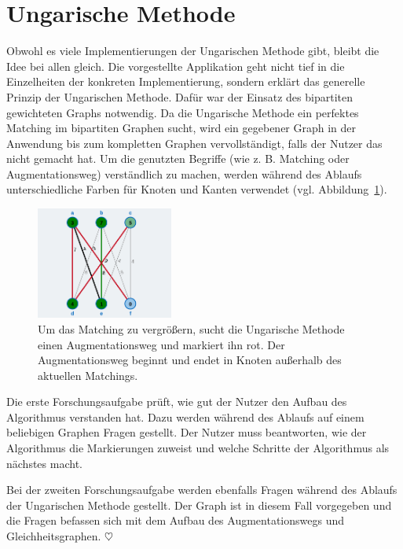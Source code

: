 \section{Ungarische Methode} %

Obwohl es viele Implementierungen der Ungarischen Methode gibt, bleibt die Idee bei allen gleich. Die vorgestellte Applikation geht nicht tief in die Einzelheiten der konkreten Implementierung, sondern erklärt das generelle Prinzip der Ungarischen Methode. Dafür war der Einsatz des bipartiten gewichteten Graphs notwendig. Da die Ungarische Methode ein perfektes Matching im bipartiten Graphen sucht, wird ein gegebener Graph in der Anwendung bis zum kompletten Graphen vervollständigt, falls der Nutzer das nicht gemacht hat. Um die genutzten Begriffe (wie z. B. Matching oder Augmentationsweg) verständlich zu machen, werden während des Ablaufs unterschiedliche Farben für Knoten und Kanten verwendet (vgl. Abbildung~\ref{fig:hungarian-colors}).

\begin{figure}[h!]
	\centering
	\includegraphics[width=0.4\textwidth]{figures/hungarian-colors}
	\caption[Ungarische Methode: Augmentationsweg]{Um das Matching zu vergrößern, sucht die Ungarische Methode einen Augmentationsweg und markiert ihn rot. Der Augmentationsweg beginnt und endet in Knoten außerhalb des aktuellen Matchings. }\label{fig:hungarian-colors}
\end{figure}

Die erste Forschungsaufgabe prüft, wie gut der Nutzer den Aufbau des Algorithmus verstanden hat. Dazu werden während des Ablaufs auf einem beliebigen Graphen Fragen gestellt. Der Nutzer muss beantworten, wie der Algorithmus die Markierungen zuweist und welche Schritte der Algorithmus als nächstes macht. 

Bei der zweiten Forschungsaufgabe werden ebenfalls Fragen während des Ablaufs der Ungarischen Methode gestellt. Der Graph ist in diesem Fall vorgegeben und die Fragen befassen sich mit dem Aufbau des Augmentationswegs und Gleichheitsgraphen. \hfill$\heartsuit$

